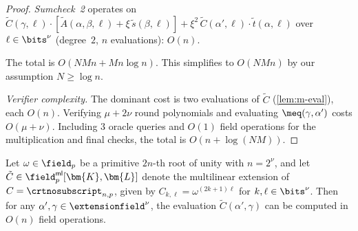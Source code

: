 \begin{proof}
\emph{Sumcheck~2} operates on $\tilde{C}(\gamma,\ell) \cdot
[\tilde{A}(\alpha,\beta,\ell) + \xi\,\tilde{s}(\beta,\ell)]
 + \xi^2\,\tilde{C}(\alpha',\ell)\cdot\tilde{t}(\alpha,\ell)$
over $\ell \in \bits^\nu$ (degree~$2$, $n$ evaluations): $O(n)$.

The total is $O(NMn + Mn\log n)$. This simplifies to $O(NMn)$ by our assumption $N \ge \log n$.

\emph{Verifier complexity.}
The dominant cost is two evaluations of $\tilde{C}$ (\cref{lem:m-eval}), each $O(n)$. Verifying $\mu+2\nu$ round polynomials and evaluating $\meq(\gamma,\alpha')$ costs $O(\mu+\nu)$. Including $3$ oracle queries and $O(1)$ field operations for the multiplication and final checks, the total is $O(n + \log(NM))$.
\end{proof}

\begin{lemma}\label{lem:m-eval}
    Let $\omega \in \field_p$ be a primitive $2n$-th root of unity with $n = 2^\nu$, and let $\tilde{C} \in \field_p^{\mathsf{ml}}[\bm{K},\bm{L}]$ denote the multilinear extension of $C = \crtnosubscript_{n,p}$, given by $C_{k,\ell} = \omega^{(2k+1)\ell}$ for $k,\ell \in \bits^\nu$. Then for any $\alpha', \gamma \in \extensionfield^\nu$, the evaluation $\tilde{C}(\alpha', \gamma)$ can be computed in $O(n)$ field operations.
\end{lemma}

